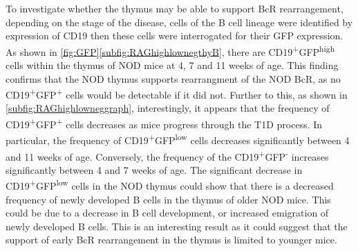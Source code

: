 To investigate whether the thymus may be able to support BcR rearrangement, depending on the stage of the disease, cells of the B cell lineage were identified by expression of CD19 then these cells were interrogated for their GFP expression.
As shown in \cref{fig:GFP}\ref{subfig:RAGhighlownegthyB}, there are CD19\textsuperscript{+}GFP\textsuperscript{high} cells within the thymus of NOD mice at 4, 7 and 11 weeks of age.
This finding confirms that the NOD thymus supports rearrangment of the NOD BcR, as no CD19\textsuperscript{+}GFP\textsuperscript{+} cells would be detectable if it did not.
Further to this, as shown in \cref{subfig:RAGhighlowneggraph}, interestingly, it appears that the frequency of CD19\textsuperscript{+}GFP\textsuperscript{+} cells decreases as mice progress through the T1D process.
In particular, the frequency of CD19\textsuperscript{+}GFP\textsuperscript{low} cells decreases significantly between 4 and 11 weeks of age.
Conversely, the frequency of the CD19\textsuperscript{+}GFP\textsuperscript{-} increases significantly between 4 and 7 weeks of age.
The significant decrease in CD19\textsuperscript{+}GFP\textsuperscript{low} cells in the NOD thymus could show that there is a decreased frequency of newly developed B cells in the thymus of older NOD mice.
This could be due to a decrease in B cell development, or increased emigration of newly developed B cells.
This is an interesting result as it could suggest that the support of early BcR rearrangement in the thymus is limited to younger mice.



